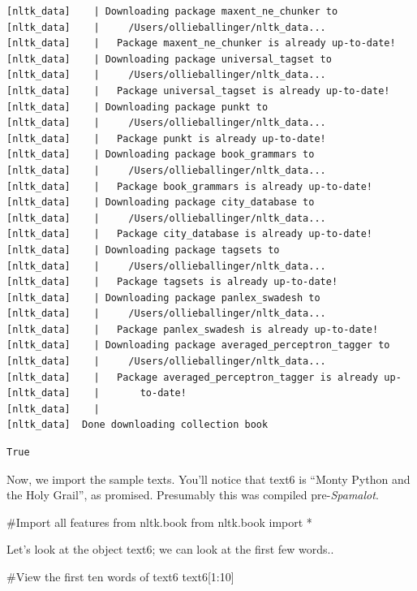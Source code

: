 \documentclass[
  letterpaper,
  DIV=11,
  numbers=noendperiod]{scrreprt}
\newenvironment{Shaded}{\begin{snugshade}}{\end{snugshade}}
\newcommand{\CommentTok}[1]{\textcolor[rgb]{0.37,0.37,0.37}{#1}}
\newcommand{\DecValTok}[1]{\textcolor[rgb]{0.68,0.00,0.00}{#1}}
\newcommand{\ImportTok}[1]{\textcolor[rgb]{0.00,0.46,0.62}{#1}}
\newcommand{\NormalTok}[1]{\textcolor[rgb]{0.00,0.23,0.31}{#1}}
\newcommand{\OperatorTok}[1]{\textcolor[rgb]{0.37,0.37,0.37}{#1}}
\begin{document}
\begin{verbatim}
[nltk_data]    | Downloading package maxent_ne_chunker to
[nltk_data]    |     /Users/ollieballinger/nltk_data...
[nltk_data]    |   Package maxent_ne_chunker is already up-to-date!
[nltk_data]    | Downloading package universal_tagset to
[nltk_data]    |     /Users/ollieballinger/nltk_data...
[nltk_data]    |   Package universal_tagset is already up-to-date!
[nltk_data]    | Downloading package punkt to
[nltk_data]    |     /Users/ollieballinger/nltk_data...
[nltk_data]    |   Package punkt is already up-to-date!
[nltk_data]    | Downloading package book_grammars to
[nltk_data]    |     /Users/ollieballinger/nltk_data...
[nltk_data]    |   Package book_grammars is already up-to-date!
[nltk_data]    | Downloading package city_database to
[nltk_data]    |     /Users/ollieballinger/nltk_data...
[nltk_data]    |   Package city_database is already up-to-date!
[nltk_data]    | Downloading package tagsets to
[nltk_data]    |     /Users/ollieballinger/nltk_data...
[nltk_data]    |   Package tagsets is already up-to-date!
[nltk_data]    | Downloading package panlex_swadesh to
[nltk_data]    |     /Users/ollieballinger/nltk_data...
[nltk_data]    |   Package panlex_swadesh is already up-to-date!
[nltk_data]    | Downloading package averaged_perceptron_tagger to
[nltk_data]    |     /Users/ollieballinger/nltk_data...
[nltk_data]    |   Package averaged_perceptron_tagger is already up-
[nltk_data]    |       to-date!
[nltk_data]    | 
[nltk_data]  Done downloading collection book
\end{verbatim}

\begin{verbatim}
True
\end{verbatim}

Now, we import the sample texts. You'll notice that text6 is ``Monty
Python and the Holy Grail'', as promised. Presumably this was compiled
pre-\emph{Spamalot}.

\begin{Shaded}
\begin{Highlighting}[]
\CommentTok{\#Import all features from nltk.book}
\ImportTok{from}\NormalTok{ nltk.book }\ImportTok{import} \OperatorTok{*}
\end{Highlighting}
\end{Shaded}

Let's look at the object text6; we can look at the first few words..

\begin{Shaded}
\begin{Highlighting}[]
\CommentTok{\#View the first ten words of text6}
\NormalTok{text6[}\DecValTok{1}\NormalTok{:}\DecValTok{10}\NormalTok{]}
\end{Highlighting}
\end{Shaded}
\end{document}
